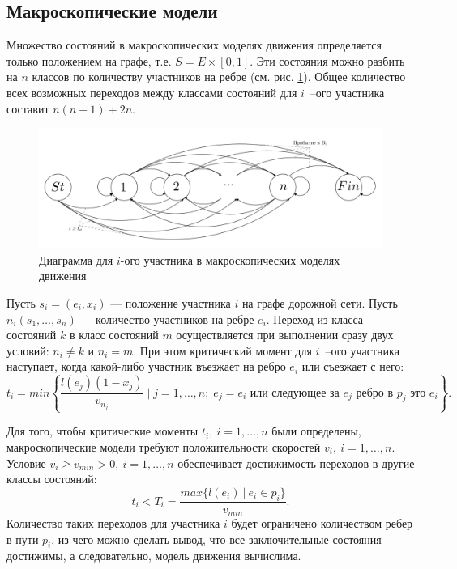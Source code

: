 \documentclass[12pt, a4paper]{article}
\begin{document}
	
	\subsection{Макроскопические модели}
	
	
	Множество состояний в макроскопических моделях движения определяется только положением на графе, т.е. $S = E \times [0, 1]$. Эти состояния
	можно разбить на $n$ классов по количеству участников на ребре (см. рис. \ref{ris:macro_diag}).  Общее количество всех возможных переходов между классами состояний для $i$~--ого участника составит $n(n-1) + 2n$.
	
	\begin{figure}[H]
		\centering
		\includegraphics[scale=0.2]{Macro-gen.png}
		\caption{Диаграмма для $i$-ого участника в макроскопических моделях движения}
		\label{ris:macro_diag}
	\end{figure}
	Пусть $s_i = (e_i, x_i)$ --- положение участника $i$ на графе дорожной сети. Пусть $n_i(s_1, \dots, s_n)$ --- количество участников на ребре $e_i$. Переход из класса состояний $k$ в класс состояний $m$ осуществляется при выполнении сразу двух условий: $n_i \neq k$ и $n_i = m$. При этом критический момент для $i$~--ого участника наступает, когда какой-либо участник въезжает на ребро $e_i$ или съезжает с него:
	$$t_i = min \left\{\frac{l(e_j)\left(1-x_j\right)}{v_{n_j}} \; \bigg| \; j = 1, \dots, n; \; e_j = e_i \text{ или следующее за } e_j \text{ ребро в } p_j \text{ это } e_i\right\}.$$
	
	Для того, чтобы критические моменты $t_i, \: i = 1, \dots, n$ были определены, макроскопические модели требуют положительности скоростей $v_i, \: i = 1, \dots, n$. Условие $v_i \ge v_{min} > 0, \: i = 1, \dots, n$ обеспечивает достижимость переходов в другие классы состояний:
	$$t_i < T_i = \frac{max\{l(e_i) \: | \: e_i \in p_i\}}{v_{min}}.$$
	Количество таких переходов для участника $i$ будет ограничено количеством ребер в пути $p_i$, из чего можно сделать вывод, что все заключительные состояния достижимы, а следовательно, модель движения вычислима.
	
\end{document}
